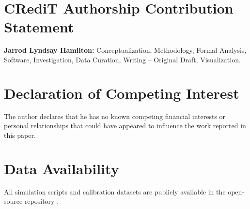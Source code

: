 \documentclass[preprint,12pt,authoryear]{elsarticle}
\begin{document}
\section*{CRediT Authorship Contribution Statement}
\textbf{Jarrod Lyndsay Hamilton:} Conceptualization, Methodology, Formal Analysis, Software, Investigation, Data Curation, Writing -- Original Draft, Visualization.

\section*{Declaration of Competing Interest}
The author declares that he has no known competing financial interests or personal relationships that could have appeared to influence the work reported in this paper.

\section*{Data Availability}
All simulation scripts and calibration datasets are publicly available in the open-source repository \citep{hamilton2026vpe49}.



\end{document}
